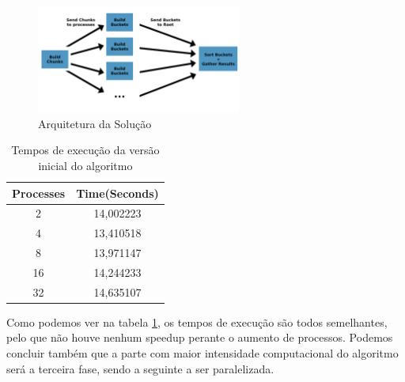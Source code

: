\documentclass[a4paper]{report}
\begin{document}
\begin{figure}[h]
    \centering
    \includegraphics[width=0.6\textwidth]{images/esquemas/algoritmo_graph1.png}
    \caption{Arquitetura da Solução}
\end{figure}

\begin{table}[h]
    \centering
    \begin{tabular}{|c|c|}
        \hline
        Processes & Time(Seconds) \\ \hline
        2         & 14,002223     \\ \hline
        4         & 13,410518     \\ \hline
        8         & 13,971147     \\ \hline
        16        & 14,244233     \\ \hline
        32        & 14,635107     \\ \hline
    \end{tabular}
    \caption{Tempos de execução da versão inicial do algoritmo}
    \label{tab:oldtimes}
\end{table}

Como podemos ver na tabela \ref{tab:oldtimes}, os tempos de execução são todos
semelhantes, pelo que não houve nenhum speedup perante o aumento de processos.
Podemos concluir também que a parte com maior intensidade computacional do
algoritmo será a terceira fase, sendo a seguinte a ser paralelizada.
\end{document}
